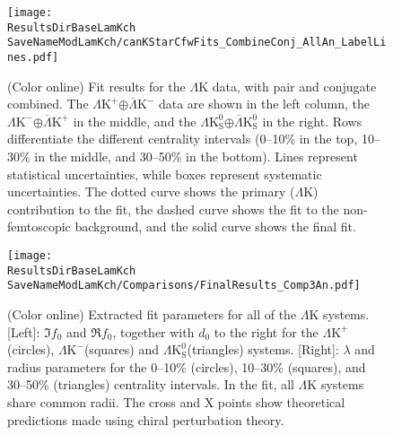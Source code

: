 \documentclass[ALICE,manyauthors]{cernphprep}
\newcommand{\ResultsDirBaseLamKch}{/home/jesse/Analysis/FemtoAnalysis/Results/Results_cLamcKch_20190319/}
\newcommand{\ResultsDirBaseLamKs}{/home/jesse/Analysis/FemtoAnalysis/Results/Results_cLamK0_20190319/}
\newcommand{\MomRes}{_MomResCrctn}%
\newcommand{\NonFlatBgdLamKch}{_NonFlatBgdCrctnLamK0LamKchPolynomial}
\newcommand{\NonFlatBgdLamKs}{_NonFlatBgdCrctnLamK0LamKchPolynomial}
\newcommand{\ResNum}{_3Res}
\newcommand{\PrimMaxDecay}{_PrimMaxDecay10fm}
\newcommand{\ResMethod}{_UsingXiDataAndCoulombOnly}
\newcommand{\ParamFixAndShareLamKch}{_ShareLam_Dualie_ShareLam_ShareRadii}
\newcommand{\ParamFixAndShareLamKs}{_ShareLam_Dualie_ShareLam_ShareRadii}
\newcommand{\SaveNameModLamKch}{\MomRes\NonFlatBgdLamKch\ResNum\PrimMaxDecay\ResMethod\ParamFixAndShareLamKch}
\newcommand{\SaveNameModLamKs}{\MomRes\NonFlatBgdLamKs\ResNum\PrimMaxDecay\ResMethod\ParamFixAndShareLamKs}
\newcommand{\LamK}{$\Lambda$K\xspace}
\newcommand{\LamKchP}{$\Lambda\mathrm{K^{+}}$\xspace}
\newcommand{\ALamKchM}{$\overline{\Lambda}\mathrm{K^{-}}$\xspace}
\newcommand{\LamKchM}{$\Lambda\mathrm{K^{-}}$\xspace}
\newcommand{\ALamKchP}{$\overline{\Lambda}\mathrm{K^{+}}$\xspace}
\newcommand{\LamKs}{$\Lambda\mathrm{K^{0}_{S}}$\xspace}
\newcommand{\ALamKs}{$\overline{\Lambda}\mathrm{K^{0}_{S}}$\xspace}
\begin{document}
\begin{figure}[h!]
  \centering
  \texttt{[image: \\ResultsDirBaseLamKch\\SaveNameModLamKch/canKStarCfwFits\_CombineConj\_AllAn\_LabelLines.pdf]}
  \caption[\LamK data with fits]
  {
  (Color online) Fit results for the \LamK data, with pair and conjugate combined.
  The \LamKchP$\oplus$\ALamKchM data are shown in the left column, the \LamKchM$\oplus$\ALamKchP in the middle, and the \LamKs$\oplus$\ALamKs in the right. 
  Rows differentiate the different centrality intervals (0--10\% in the top, 10--30\% in the middle, and 30--50\% in the bottom).
  Lines represent statistical uncertainties, while boxes represent systematic uncertainties.
  The dotted curve shows the primary (\LamK) contribution to the fit, the dashed curve shows the fit to the non-femtoscopic background, and the solid curve shows the final fit.
 }
  \label{fig:LamKFits_3Res}
\end{figure}

\begin{figure}[h]
  \centering
  \texttt{[image: \\ResultsDirBaseLamKch\\SaveNameModLamKch/Comparisons/FinalResults\_Comp3An.pdf]}
  \caption[Extracted Scattering Parameters]
  {
  (Color online) Extracted fit parameters for all of the \LamK systems.  
  [Left]: $\Im f_{0}$ and $\Re f_{0}$, together with $d_{0}$ to the right for the \LamKchP (circles), \LamKchM (squares) and \LamKs (triangles) systems.  
  [Right]: $\lambda$ and radius parameters for the 0--10\% (circles), 10--30\% (squares), and 30--50\% (triangles) centrality intervals.  
  In the fit, all \LamK systems share common radii.
  The cross \cite{Liu:2006xja} and X \cite{Mai:2009ce} points show theoretical predictions made using chiral perturbation theory.
  }
  \label{fig:ScattParams_3Res}
\end{figure}
\end{document}
